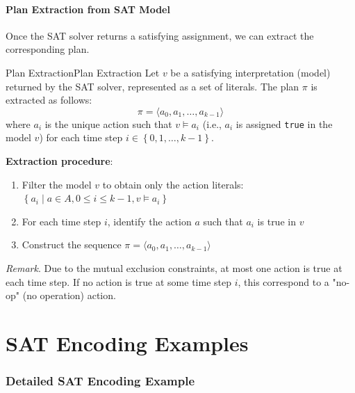 \documentclass[a4paper]{article}
\theoremstyle{definition}
\begin{document}
\subsection{Plan Extraction from SAT Model}
Once the SAT solver returns a satisfying assignment, we can extract the corresponding plan.
\begin{definition}{Plan Extraction}{Plan Extraction}
Let \( v \) be a satisfying interpretation (model) returned by the SAT solver, represented as a set of literals. The plan \( \pi \) is extracted as follows:
\[
  \pi = \langle a_0, a_1, \ldots, a_{k - 1} \rangle
\]    
where \( a_i \) is the unique action such that \( v \models a_i \) (i.e., $a_i$ is assigned \texttt{true} in the model $v$) for each time 
step \( i \in \left\{ 0,1,\ldots,k-1 \right\} \).
\end{definition}
\textbf{Extraction procedure}:
\begin{enumerate}
    \item Filter the model \( v \) to obtain only the action literals: \( \left\{ a_i \;|\; a \in A, 0 \leq i \leq k - 1, v \models a_i \right\} \)     
    \item For each time step \( i \), identify the action \( a \) such that \( a_i \) is true in \( v \)      
    \item Construct the sequence \( \pi = \langle a_0, a_1, \ldots, a_{k - 1} \rangle \)    
\end{enumerate}
\textit{Remark}. Due to the mutual exclusion constraints, at most one action is true at each time step. If no action is true at some time step 
\( i \), this correspond to a "no-op" (no operation) action.
\part{SAT Encoding Examples}
\section{Detailed SAT Encoding Example}
\end{document}
